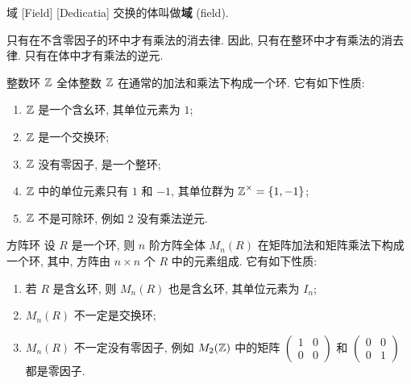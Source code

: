         \begin{dfn}
            {域}
            [Field]
            [Dedicatia]
            交换的体叫做\textbf{域} (field).
        \end{dfn}

        \begin{rmk}
            [Dedicatia]
            只有在不含零因子的环中才有乘法的消去律. 因此, 只有在整环中才有乘法的消去律. 只有在体中才有乘法的逆元.
        \end{rmk}

        \begin{ins}
            {整数环 \(\operatorname{\mathbb{Z}}\)}
            全体整数 \(\operatorname{\mathbb{Z}}\) 在通常的加法和乘法下构成一个环. 它有如下性质:
            \begin{enumerate}[label=(\arabic*)]
                \item \(\operatorname{\mathbb{Z}}\) 是一个含幺环, 其单位元素为 \(1\);
                \item \(\operatorname{\mathbb{Z}}\) 是一个交换环;
                \item \(\operatorname{\mathbb{Z}}\) 没有零因子, 是一个整环;
                \item \(\operatorname{\mathbb{Z}}\) 中的单位元素只有 \(1\) 和 \(-1\), 其单位群为 \(\operatorname{\mathbb{Z}}^\times=\{1, -1\}\);
                \item \(\operatorname{\mathbb{Z}}\) 不是可除环, 例如 \(2\) 没有乘法逆元.
            \end{enumerate}
        \end{ins}

        \begin{ins}
            {方阵环}
            设 \(R\) 是一个环, 则 \(n\) 阶方阵全体 \(M_n(R)\) 在矩阵加法和矩阵乘法下构成一个环, 其中, 方阵由 \(n\times n\) 个 \(R\) 中的元素组成. 它有如下性质:
            \begin{enumerate}
                \item 若 \(R\) 是含幺环, 则 \(M_n(R)\) 也是含幺环, 其单位元素为 \(I_n\);
                \item \(M_n(R)\) 不一定是交换环;
                \item \(M_n(R)\) 不一定没有零因子, 例如 \(M_2(\operatorname{\mathbb{Z}})\) 中的矩阵 \(\begin{pmatrix}1 & 0 \\ 0 & 0\end{pmatrix}\) 和 \(\begin{pmatrix}0 & 0 \\ 0 & 1\end{pmatrix}\) 都是零因子.
            \end{enumerate}
        \end{ins}

